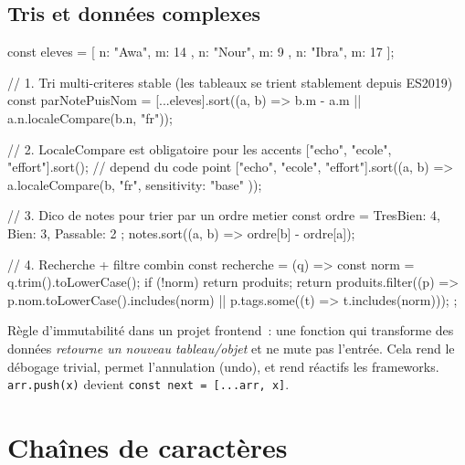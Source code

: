 \subsection{Tris et donn\'ees complexes}

\begin{codejs}
const eleves = [{ n: "Awa", m: 14 }, { n: "Nour", m: 9 }, { n: "Ibra", m: 17 }];

// 1. Tri multi-criteres stable (les tableaux se trient stablement depuis ES2019)
const parNotePuisNom = [...eleves].sort((a, b) => b.m - a.m || a.n.localeCompare(b.n, "fr"));

// 2. LocaleCompare est obligatoire pour les accents
["echo", "ecole", "effort"].sort();                              // depend du code point
["echo", "ecole", "effort"].sort((a, b) => a.localeCompare(b, "fr", { sensitivity: "base" }));

// 3. Dico de notes pour trier par un ordre metier
const ordre = { TresBien: 4, Bien: 3, Passable: 2 };
notes.sort((a, b) => ordre[b] - ordre[a]);

// 4. Recherche + filtre combin
const recherche = (q) => {
  const norm = q.trim().toLowerCase();
  if (!norm) return produits;
  return produits.filter((p) => p.nom.toLowerCase().includes(norm) || p.tags.some((t) => t.includes(norm)));
};
\end{codejs}

\begin{astuce}
R\`egle d'immutabilit\'e dans un projet frontend~: une fonction qui transforme des donn\'ees
\emph{retourne un nouveau tableau/objet} et ne mute pas l'entr\'ee. Cela rend le d\'ebogage trivial,
permet l'annulation (undo), et rend r\'eactifs les frameworks. \verb|arr.push(x)| devient
\verb|const next = [...arr, x]|.
\end{astuce}

\section{Cha\^ines de caract\`eres}

